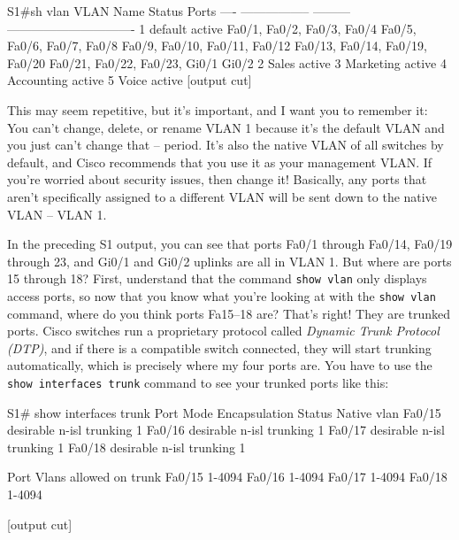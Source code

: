 \documentclass[b5paper,11pt]{memoir}
\begin{document}
\begin{cli}
S1#sh vlan
VLAN Name              Status    Ports
---- ----------------- --------- -------------------------------
1    default           active    Fa0/1, Fa0/2, Fa0/3, Fa0/4
                                 Fa0/5, Fa0/6, Fa0/7, Fa0/8
                                 Fa0/9, Fa0/10, Fa0/11, Fa0/12
                                 Fa0/13, Fa0/14, Fa0/19, Fa0/20
                                 Fa0/21, Fa0/22, Fa0/23, Gi0/1
                                 Gi0/2
2    Sales             active
3    Marketing         active
4    Accounting        active
5    Voice             active
[output cut]
\end{cli}

This may seem repetitive, but it's important, and I want you to remember
it: You can't change, delete, or rename VLAN 1 because it's the default
VLAN and you just can't change that -- period. It's also the native VLAN
of all switches by default, and Cisco recommends that you use it as your
management VLAN. If you're worried about security issues, then change
it! Basically, any ports that aren't specifically assigned to a
different VLAN will be sent down to the native VLAN -- VLAN 1.

In the preceding S1 output, you can see that ports Fa0/1 through Fa0/14,
Fa0/19 through 23, and Gi0/1 and Gi0/2 uplinks are all in VLAN 1. But
where are ports 15 through 18? First, understand that the command
\texttt{show\ vlan} only displays access ports, so now that you know
what you're looking at with the \texttt{show\ vlan} command, where do
you think ports Fa15--18 are? That's right! They are trunked ports.
Cisco switches run a proprietary protocol called \emph{Dynamic Trunk
Protocol (DTP)}, and if there is a compatible switch connected, they
will start trunking automatically, which is precisely where my four
ports are. You have to use the \texttt{show\ interfaces\ trunk} command
to see your trunked ports like this:

\begin{cli}
S1# show interfaces trunk
Port        Mode             Encapsulation  Status        Native vlan
Fa0/15      desirable        n-isl          trunking      1
Fa0/16      desirable        n-isl          trunking      1
Fa0/17      desirable        n-isl          trunking      1
Fa0/18      desirable        n-isl          trunking      1

Port        Vlans allowed on trunk
Fa0/15      1-4094
Fa0/16      1-4094
Fa0/17      1-4094
Fa0/18      1-4094

[output cut]
\end{cli}
\end{document}

